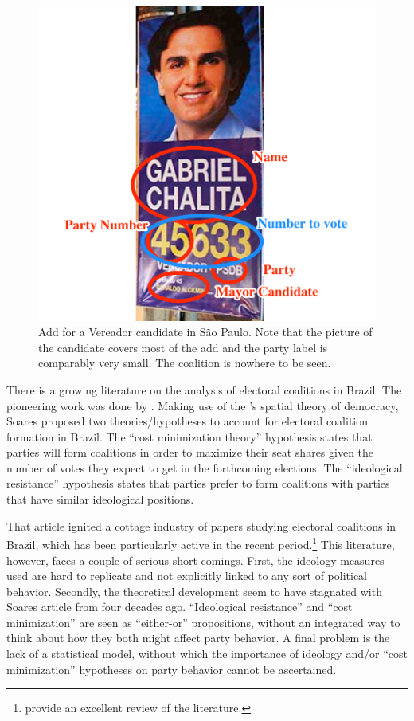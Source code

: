 \begin{figure}
  \centering
  \includegraphics[width=.5\textwidth]{../images/coalitions/propaganda_sp.pdf}
  \caption{Add for a Vereador candidate in São Paulo. Note that the picture of the candidate covers most of the add and the party label is comparably very small. The coalition is nowhere to be seen.}
  \label{fig:add_sp}
\end{figure}


There is a growing literature on the analysis of electoral coalitions in Brazil. The pioneering work was done by  \citet{soares:1964}. Making use of the \citet{downs:1957}'s spatial theory of democracy, Soares proposed two theories/hypotheses to account for electoral coalition formation in Brazil.  The  ``cost minimization theory'' hypothesis  states that parties will form coalitions 
in order to maximize their seat shares given the number of votes they expect to get in the forthcoming elections. The ``ideological resistance'' hypothesis states that parties prefer to form coalitions with parties that have similar ideological positions. 

That article ignited a cottage industry of papers studying electoral coalitions in Brazil, which has been particularly active in the recent period.\footnote{\citet{miguel:2007} provide an excellent review of the literature.} This literature, however, faces a couple of serious short-comings. First, the ideology measures used are hard to replicate and not explicitly linked to any sort of political behavior. Secondly, the theoretical development seem to have stagnated with Soares article from four decades ago. ``Ideological resistance'' and ``cost minimization'' are seen as ``either-or'' propositions, without an integrated way to think about how they both might affect party behavior. A final problem is the lack of a statistical model, without which the  importance of ideology and/or  ``cost minimization'' hypotheses on party behavior cannot be ascertained. 






